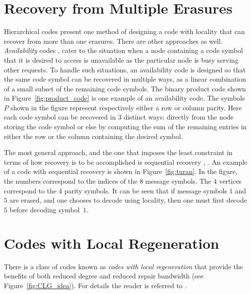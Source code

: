 \begin{multicols}{2}
\section{Recovery from Multiple Erasures} 

\vskip -3pt

Hierarchical codes present one method of designing a code with locality that can recover from more than one erasures.  There are other approaches as well.  {\em Availability} codes \cite{WanZha}, \cite{WanZhaLiu} cater to the situation when a node containing a code symbol that it is desired to access is unavailable as the particular node is busy serving other requests.  To handle such situations, an availability code is designed so that the same code symbol can be recovered in multiple ways, as a linear combination of a small subset of the remaining code symbols.  The binary product code shown in Figure~\ref{fig:product_code} is one example of an availability code.  The symbols $P$ shown in the figure represent respectively either a row or column parity. Here each code symbol can be recovered in $3$ distinct ways: directly from the node storing the code symbol or else by computing the sum of the remaining entries in either the row or the column containing the desired symbol.

The most general approach, and the one that imposes the least constraint in terms of how recovery is to be accomplished is sequential recovery \cite{PraLalKum}, \cite{BalKinKum_ISIT}.  An example of a code with sequential recovery is shown in Figure~\ref{fig:turan}. In the figure, the numbers correspond to the indices of the $8$ message symbols.  The $4$ vertices correspond to the $4$ parity symbols.  It can be seen that if message symbols $1$ and $5$ are erased, and one chooses to decode using locality, then one must first decode $5$ before decoding symbol~$1$.\\[-15pt]

\section{Codes with Local Regeneration}

There is a class of codes known as {\em codes with local regeneration} that provide the benefits of both reduced degree and reduced repair bandwidth (see Figure~\ref{fig:CLG_idea}).  For details the reader is referred to \cite{KamPraLalKum,RawKoySilVis,KrishnanRK18}.\\[-15pt]


\end{multicols}
